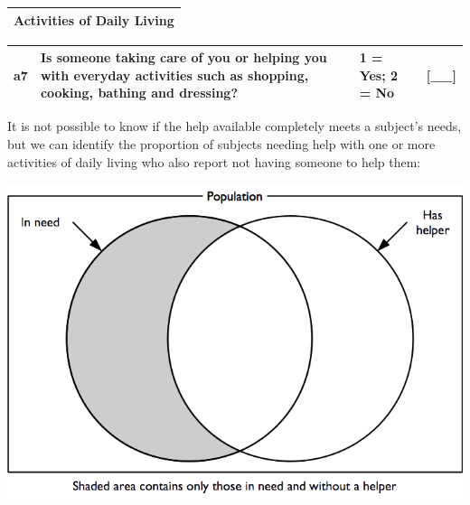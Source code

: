 \documentclass[12pt,a4paper]{book}
\theoremstyle{definition}
\theoremstyle{definition}
\theoremstyle{definition}
\theoremstyle{remark}
\begin{document}
\begin{longtable}[]{@{}c@{}}
\toprule
\begin{minipage}[t]{0.97\columnwidth}\centering
\textbf{Activities of Daily Living}\strut
\end{minipage}\tabularnewline
\bottomrule
\end{longtable}

\begin{longtable}[]{@{}llll@{}}
\toprule
\begin{minipage}[t]{0.09\columnwidth}\raggedright
a7\strut
\end{minipage} & \begin{minipage}[t]{0.41\columnwidth}\raggedright
Is someone taking care of you or helping you with everyday activities
such as shopping, cooking, bathing and dressing?\strut
\end{minipage} & \begin{minipage}[t]{0.25\columnwidth}\raggedright
1 = Yes; 2 = No\strut
\end{minipage} & \begin{minipage}[t]{0.13\columnwidth}\raggedright
{[}\_\_{]}\strut
\end{minipage}\tabularnewline
\bottomrule
\end{longtable}

It is not possible to know if the help available completely meets a
subject's needs, but we can identify the proportion of subjects needing
help with one or more activities of daily living who also report not
having someone to help them:

\begin{center}\includegraphics[width=9.76in]{figures/indicators17} \end{center}
\end{document}
